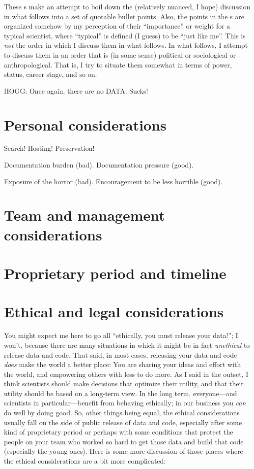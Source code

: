 \documentclass[12pt,twoside,pdftex]{article}
\begin{document}
These \tablename s make an attempt to boil down the (relatively nuanced, I
hope) discussion in what follows into a set of quotable bullet points.
Also, the points in the \tablename s are organized somehow by my
perception of their ``importance'' or weight for a typical scientist,
where ``typical'' is defined (I guess) to be ``just like me''.
This is \emph{not} the order in which I discuss them in what follows.
In what follows, I attempt to discuss them in an order that is (in
some sense) political or sociological or anthropological.
That is, I try to situate them somewhat in terms of power, status,
career stage, and so on.

HOGG: Once again, there are no DATA. Sucks!

\section{Personal considerations}

Search! Hosting! Preservation!

Documentation burden (bad). Documentation pressure (good).

Exposure of the horror (bad). Encouragement to be less horrible (good).

\section{Team and management considerations}

\section{Proprietary period and timeline}

\section{Ethical and legal considerations}

You might expect me here to go all ``ethically, you must release your
data!''; I won't, because there are many situations in which it might
be in fact \emph{unethical} to release data and code.
That said, in most cases, releasing your data and code \emph{does}
make the world a better place: You are sharing your ideas and effort
with the world, and empowering others with less to do more.
As I said in the outset, I think scientists should make decisions that
optimize their utility, and that their utility should be based on a
long-term view.
In the long term, everyone---and scientists in particular---benefit
from behaving ethically; in our business you \emph{can} do well by
doing good.
So, other things being equal, the ethical considerations usually fall
on the side of public release of data and code, especially after some
kind of proprietary period or perhaps with some conditions that
protect the people on your team who worked so hard to get those data
and build that code (especially the young ones).
Here is some more discussion of those places where the ethical
considerations are a bit more complicated:
\end{document}
